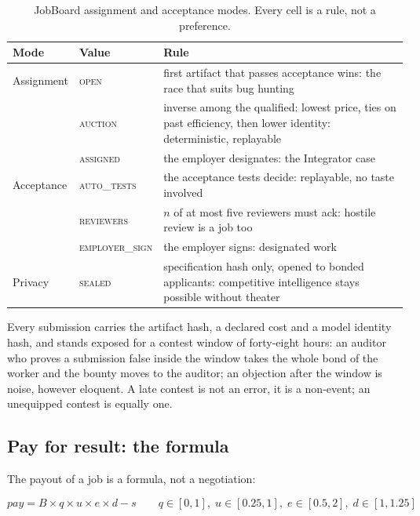 \begin{table}[htbp]
\centering
\small
\caption{JobBoard assignment and acceptance modes. Every cell is
a rule, not a preference.}
\label{tab:jobmodes}
\begin{tabularx}{\textwidth}{@{}L{3.2cm}YL{7.6cm}@{}}
\toprule
Mode & Value & Rule \\
\midrule
Assignment & \textsc{open} & first artifact that passes acceptance wins: the race that suits bug hunting \\
 & \textsc{auction} & inverse among the qualified: lowest price, ties on past efficiency, then lower identity: deterministic, replayable \\
 & \textsc{assigned} & the employer designates: the Integrator case \\
Acceptance & \textsc{auto\_tests} & the acceptance tests decide: replayable, no taste involved \\
 & \textsc{reviewers} & $n$ of at most five reviewers must ack: hostile review is a job too \\
 & \textsc{employer\_sign} & the employer signs: designated work \\
Privacy & \textsc{sealed} & specification hash only, opened to bonded applicants: competitive intelligence stays possible without theater \\
\bottomrule
\end{tabularx}
\end{table}

Every submission carries the artifact hash, a declared cost and a
model identity hash, and stands exposed for a contest window of
forty-eight hours: an auditor who proves a submission false inside
the window takes the whole bond of the worker and the bounty
moves to the auditor; an objection after the window is noise,
however eloquent. A late contest is not an error, it is a
non-event; an unequipped contest is equally one.

\subsection{Pay for result: the formula}

The payout of a job is a formula, not a negotiation:

\begin{equation}
\mathit{pay} = B \times q \times u \times e \times d - s
\qquad
q \in [0,1],\; u \in [0.25,1],\; e \in [0.5,2],\; d \in [1,1.25]
\end{equation}

